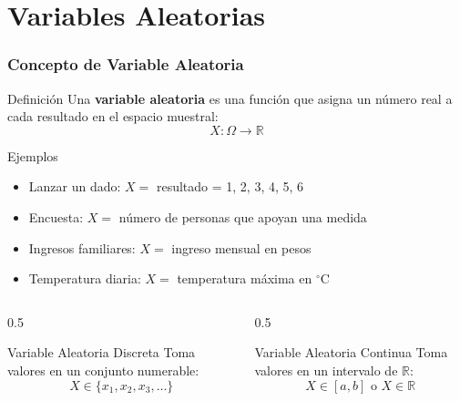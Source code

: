 \documentclass[aspectratio=169,11pt]{beamer}
\begin{document}
\section{Variables Aleatorias}

\begin{frame}[fragile]
\frametitle{Concepto de Variable Aleatoria}

\begin{block}{Definición}
Una \textbf{variable aleatoria} es una función que asigna un número real a cada resultado en el espacio muestral:
$$X: \Omega \to \mathbb{R}$$
\end{block}

\pause
\vspace{0.3cm}
\begin{exampleblock}{Ejemplos}
\begin{itemize}
  \item Lanzar un dado: $X = $ resultado = 1, 2, 3, 4, 5, 6
  \item Encuesta: $X = $ número de personas que apoyan una medida
  \item Ingresos familiares: $X = $ ingreso mensual en pesos
  \item Temperatura diaria: $X = $ temperatura máxima en $^\circ$C
\end{itemize}
\end{exampleblock}

\pause
\vspace{0.3cm}
\begin{columns}[T]
\begin{column}{0.5\textwidth}
\begin{block}{Variable Aleatoria Discreta}
Toma valores en un conjunto numerable:
$$X \in \{x_1, x_2, x_3, \ldots\}$$
\end{block}
\end{column}

\begin{column}{0.5\textwidth}
\begin{block}{Variable Aleatoria Continua}
Toma valores en un intervalo de $\mathbb{R}$:
$$X \in [a, b] \text{ o } X \in \mathbb{R}$$
\end{block}
\end{column}
\end{columns}
\end{frame}
\end{document}
